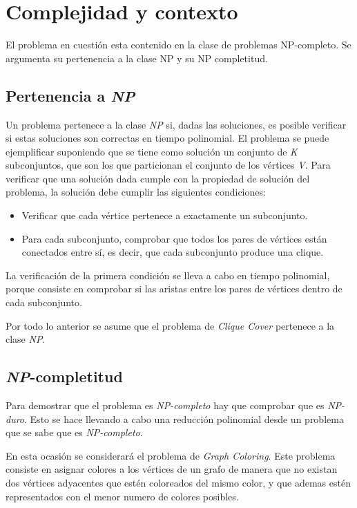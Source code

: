 \section{Complejidad y contexto}
El problema en cuestión esta contenido en la clase de problemas NP-completo. Se argumenta su pertenencia a la clase NP y su NP completitud.

\subsection{Pertenencia a \textit{NP}}

Un problema pertenece a la clase \textit{NP} si, dadas las soluciones, es posible verificar si estas soluciones son correctas en tiempo polinomial. El problema se puede ejemplificar suponiendo que se tiene como solución un conjunto de \textit{K} subconjuntos, que son los que particionan el conjunto de los vértices \textit{V}. Para verificar que una solución dada cumple con la propiedad de solución del problema, la solución debe cumplir las siguientes condiciones:

\begin{itemize}
    \item Verificar que cada vértice pertenece a exactamente un subconjunto.
    \item Para cada subconjunto, comprobar que todos los pares de vértices están conectados entre sí, es decir, que cada subconjunto produce una clique.
\end{itemize}

La verificación de la primera condición se lleva a cabo en tiempo polinomial, porque consiste en comprobar si las aristas entre los pares de vértices dentro de cada subconjunto.

Por todo lo anterior se asume que el problema de \textit{Clique Cover} pertenece a la clase \textit{NP}.

\subsection{\textit{NP}-completitud}

Para demostrar que el problema es \textit{NP-completo} hay que comprobar que es \textit{NP-duro}. Esto se hace llevando a cabo una reducción polinomial desde un problema que se sabe que es \textit{NP-completo}. 

En esta ocasión se considerará el problema de \textit{Graph Coloring}. Este problema consiste en asignar colores a los vértices de un grafo de manera que no existan dos vértices adyacentes que estén coloreados del mismo color, y que ademas estén representados con el menor numero de colores posibles. 

